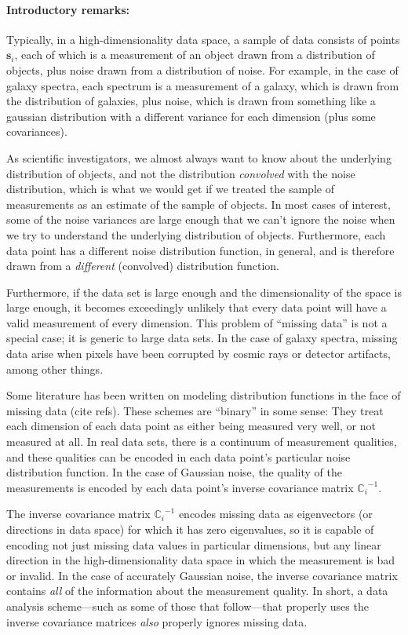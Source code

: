 \documentclass[12pt]{article}
\newcommand{\Mvector}[1]{\mathbf{#1}}
\newcommand{\point}{\Mvector{s}}
\newcommand{\spectrumi}{\point_i}
\newcommand{\Mmatrix}[1]{\mathbb{#1}}
\newcommand{\covari}{\Mmatrix{C}_i}
\newcommand{\inverse}[1]{{#1}^{-1}}
\newcommand{\invcovari}{\inverse{\covari}}
\begin{document}
\paragraph{Introductory remarks:}
Typically, in a high-dimensionality data space, a sample of data
consists of points $\spectrumi$, each of which is a measurement of an
object drawn from a distribution of objects, plus noise drawn from a
distribution of noise.  For example, in the case of galaxy spectra,
each spectrum is a measurement of a galaxy, which is drawn from the
distribution of galaxies, plus noise, which is drawn from something
like a gaussian distribution with a different variance for each
dimension (plus some covariances).

As scientific investigators, we almost always want to know about the
underlying distribution of objects, and not the distribution
\emph{convolved} with the noise distribution, which is what we would
get if we treated the sample of measurements as an estimate of the
sample of objects.  In most cases of interest, some of the noise
variances are large enough that we can't ignore the noise when we try
to understand the underlying distribution of objects.  Furthermore,
each data point has a different noise distribution function, in
general, and is therefore drawn from a \emph{different} (convolved)
distribution function.

Furthermore, if the data set is large enough and the dimensionality of
the space is large enough, it becomes exceedingly unlikely that every
data point will have a valid measurement of every dimension.  This
problem of ``missing data'' is not a special case; it is generic to
large data sets.  In the case of galaxy spectra, missing data arise
when pixels have been corrupted by cosmic rays or detector artifacts,
among other things.

Some literature has been written on modeling distribution functions in
the face of missing data (cite refs).  These schemes are
``binary'' in some sense: They treat each dimension of each data point
as either being measured very well, or not measured at all.  In real
data sets, there is a continuum of measurement qualities, and these
qualities can be encoded in each data point's particular noise
distribution function.  In the case of Gaussian noise, the quality of
the measurements is encoded by each data point's inverse covariance
matrix $\invcovari$.

The inverse covariance matrix $\invcovari$ encodes missing data as
eigenvectors (or directions in data space) for which it has zero
eigenvalues, so it is capable of encoding not just missing data values
in particular dimensions, but any linear direction in the
high-dimensionality data space in which the measurement is bad or
invalid.  In the case of accurately Gaussian noise, the inverse
covariance matrix contains \emph{all} of the information about the
measurement quality.  In short, a data analysis scheme---such as some
of those that follow---that properly uses the inverse covariance
matrices \emph{also} properly ignores missing data.
\end{document}
